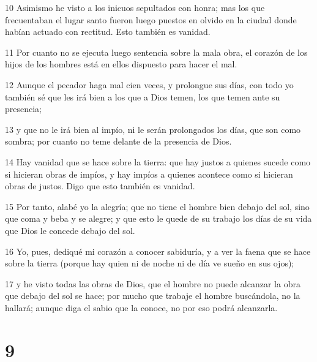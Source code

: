 \par 10 Asimismo he visto a los inicuos sepultados con honra; mas los que frecuentaban el lugar santo fueron luego puestos en olvido en la ciudad donde habían actuado con rectitud. Esto también es vanidad.
\par 11 Por cuanto no se ejecuta luego sentencia sobre la mala obra, el corazón de los hijos de los hombres está en ellos dispuesto para hacer el mal.
\par 12 Aunque el pecador haga mal cien veces, y prolongue sus días, con todo yo también sé que les irá bien a los que a Dios temen, los que temen ante su presencia;
\par 13 y que no le irá bien al impío, ni le serán prolongados los días, que son como sombra; por cuanto no teme delante de la presencia de Dios.
\par 14 Hay vanidad que se hace sobre la tierra: que hay justos a quienes sucede como si hicieran obras de impíos, y hay impíos a quienes acontece como si hicieran obras de justos. Digo que esto también es vanidad.
\par 15 Por tanto, alabé yo la alegría; que no tiene el hombre bien debajo del sol, sino que coma y beba y se alegre; y que esto le quede de su trabajo los días de su vida que Dios le concede debajo del sol.
\par 16 Yo, pues, dediqué mi corazón a conocer sabiduría, y a ver la faena que se hace sobre la tierra (porque hay quien ni de noche ni de día ve sueño en sus ojos);
\par 17 y he visto todas las obras de Dios, que el hombre no puede alcanzar la obra que debajo del sol se hace; por mucho que trabaje el hombre buscándola, no la hallará; aunque diga el sabio que la conoce, no por eso podrá alcanzarla.

\chapter{9}

